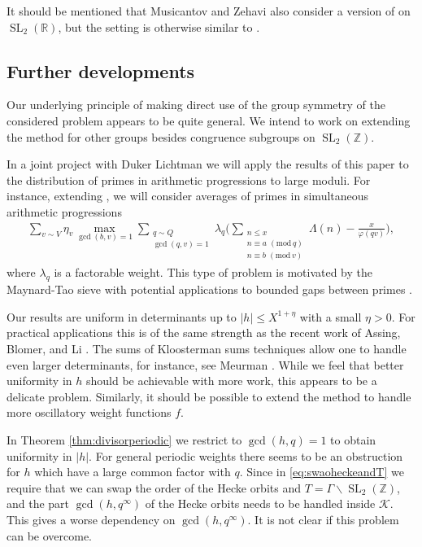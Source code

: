\documentclass[12pt]{amsart}
\theoremstyle{definition}
\theoremstyle{remark}
\numberwithin{equation}{section}
\newcommand{\R}{{\mathbb R}}
\newcommand{\Z}{{\mathbb Z}}
\newcommand{\1}{{\mathbf 1}}
\newcommand{\SL}{\operatorname{SL}_2}
\renewcommand{\pmod}[1]{\,\,(\mathrm{mod}\,{#1})}
\begin{document}
It should be mentioned that Musicantov  and Zehavi \cite{musiczeha} also consider a version of \cite{DFIprimes} on $\SL(\R)$, but the setting is otherwise similar to \cite{DFIprimes}.

\subsection{Further developments}

Our underlying principle of making direct use of the group symmetry of the considered problem appears to be quite general. We intend to work on extending the method for other groups besides congruence subgroups on $\SL(\Z)$. 


In a joint project with Duker Lichtman we will apply the results of this paper to the distribution of primes in arithmetic progressions to large moduli. For instance, extending \cite{BFI}, we will consider  averages of primes in simultaneous arithmetic progressions
\begin{align*}
    \sum_{v \sim V} \eta_v \max_{\gcd(b,v)=1}\sum_{\substack{q \sim Q \\ \gcd(q,v)=1} } \lambda_q \bigg(  \sum_{\substack{n \leq x \\ n \equiv a \pmod{q} \\ n \equiv b \pmod{v}}} \Lambda(n) - \frac{x}{\varphi(qv)}\bigg),
\end{align*}
where $\lambda_q$ is a factorable weight. This type of problem is motivated by the Maynard-Tao sieve with potential applications to bounded gaps between primes \cite{maynardsieve,polymath}.


Our results are uniform in determinants up to $|h| \leq X^{1+\eta}$ with a small $\eta>0$. For practical applications this is of the same strength as the recent work of Assing, Blomer, and Li \cite{ABL}. The sums of Kloosterman sums techniques allow one to handle even larger determinants, for instance, see Meurman \cite{meurman}. While we feel that better uniformity in $h$ should be achievable with more work, this appears to be a delicate problem. Similarly, it should be possible to extend the method to handle more oscillatory weight functions $f$. 

In Theorem \ref{thm:divisorperiodic} we restrict to $\gcd(h,q)=1$ to obtain uniformity in $|h|$. For general periodic weights there seems to be an obstruction for $h$ which have a large common factor with $q$. Since in \eqref{eq:swaoheckeandT} we require that we can swap the order of the Hecke orbits and $T=\Gamma \backslash \SL(\Z)$, and the part $\gcd(h,q^\infty)$ of the Hecke orbits needs to be handled inside $\mathcal{K}$. This gives a worse dependency on $\gcd(h,q^\infty)$. It is not clear if this problem can be overcome.
\end{document}
